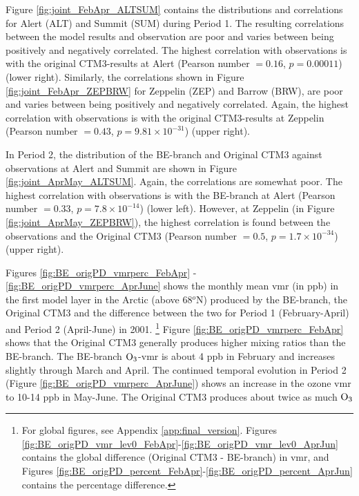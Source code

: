 \medskip

Figure \ref{fig:joint_FebApr_ALTSUM} contains the distributions and correlations for Alert (ALT) and Summit (SUM) during Period 1. The resulting correlations between the model results and observation are poor and varies between being positively and negatively correlated. The highest correlation with observations is with the original CTM3-results at Alert (Pearson number $=0.16$, $p = 0.00011$) (lower right). Similarly, the correlations shown in Figure \ref{fig:joint_FebApr_ZEPBRW} for Zeppelin (ZEP) and Barrow (BRW), are poor and varies between being positively and negatively correlated. Again, the highest correlation with observations is with the original CTM3-results at Zeppelin (Pearson number $=0.43$, $p = 9.81\times10^{-31}$) (upper right). 

\medskip

In Period 2, the distribution of the BE-branch and Original CTM3 against observations at Alert and Summit are shown in Figure \ref{fig:joint_AprMay_ALTSUM}. Again, the correlations are somewhat poor. The highest correlation with observations is with the BE-branch at Alert (Pearson number $=0.33$, $p = 7.8\times10^{-14}$) (lower left). However, at Zeppelin (in Figure \ref{fig:joint_AprMay_ZEPBRW}), the highest correlation is found between the observations and the Original CTM3 (Pearson number $=0.5$, $p = 1.7\times10^{-34}$) (upper right). 












\medskip
\medskip

Figures \ref{fig:BE_origPD_vmrperc_FebApr} - \ref{fig:BE_origPD_vmrperc_AprJune} shows the monthly mean \acrshort{vmr} (in ppb) in the first model layer in the Arctic (above 68$^o$N) produced by the BE-branch, the Original CTM3 and the difference between the two for Period 1 (February-April) and Period 2 (April-June) in 2001. \footnote{For global figures, see Appendix \ref{app:final_version}. Figures \ref{fig:BE_origPD_vmr_lev0_FebApr}-\ref{fig:BE_origPD_vmr_lev0_AprJun} contains the global difference (Original CTM3 - BE-branch) in \acrshort{vmr}, and Figures \ref{fig:BE_origPD_percent_FebApr}-\ref{fig:BE_origPD_percent_AprJun} contains the percentage difference.} Figure \ref{fig:BE_origPD_vmrperc_FebApr} shows that the Original CTM3 generally produces higher mixing ratios than the BE-branch. The BE-branch $\mathrm{O_3}$-\acrshort{vmr} is about 4 ppb in February and increases slightly through March and April. The continued temporal evolution in Period 2 (Figure \ref{fig:BE_origPD_vmrperc_AprJune}) shows an increase in the ozone \acrshort{vmr} to 10-14 ppb in May-June. The Original CTM3 produces about twice as much $\mathrm{O_3}$


